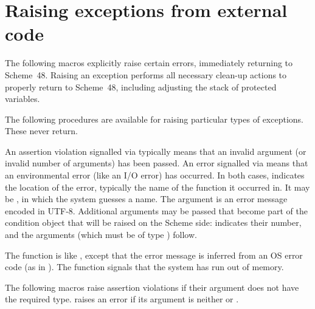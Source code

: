 \section{Raising exceptions from external code}
\label{sec:exceptions}

The following macros explicitly raise certain errors, immediately
 returning to Scheme~48.
Raising an exception performs all
 necessary clean-up actions to properly return to Scheme~48, including
 adjusting the stack of protected variables.

The following procedures are available for raising particular
 types of exceptions.
These never return.

\begin{protos}
\end{protos}

\noindent{}An assertion violation signalled via
 typically means that an invalid
argument (or invalid number of arguments) has been passed.  An error
signalled via  means that an environmental error
(like an I/O error) has occurred.  In both cases,  indicates
the location of the error, typically the name of the function it
occurred in.  It may be , in which the system guesses a
name.  The  argument is an error message encoded in
UTF-8.  Additional arguments may be passed that become part of the
condition object that will be raised on the Scheme side: 
indicates their number, and the arguments (which must be of type
) follow.

The  function is like , except
that the error message is inferred from an OS error code (as in
).  The  function
signals that the system has run out of memory.

The following macros raise assertion violations if their argument does
not have the required type.   raises an
error if its argument is neither  or .

\begin{protos}
\end{protos}

